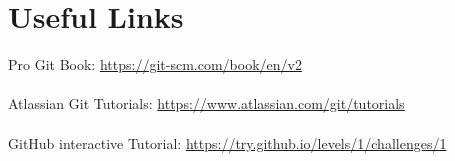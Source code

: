 \documentclass{beamer}
\begin{document}
\section{Useful Links}
\begin{frame}{\secname}
     Pro Git Book:
    \url{https://git-scm.com/book/en/v2} \\~\\   
    
    Atlassian Git Tutorials:
    \url{https://www.atlassian.com/git/tutorials} \\~\\

    GitHub interactive Tutorial:
    \url{https://try.github.io/levels/1/challenges/1}
\end{frame}
\end{document}
